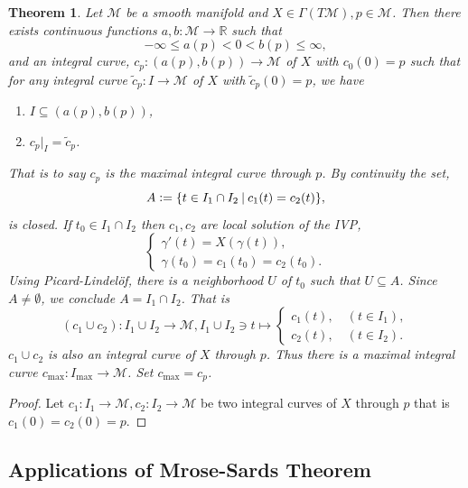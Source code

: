 \documentclass[10pt]{article}
\newtheorem{theorem}{Theorem} [section]
\newcommand{\defeq}{\vcentcolon=}
\newcommand{\R}[0]{\mathbb{R}}
\newcommand{\M}[0]{\mathcal{M}}
\newcommand{\sep}[0]{\:|\:}
\begin{document}
\begin{theorem}
  Let $\M$ be a smooth manifold and $X\in\Gamma(T\M), p\in\M$. Then there exists continuous functions $a,b:\M\to\R$ such that 
  \begin{equation*}
    -\infty \leq a(p)<0<b(p)\leq \infty,
  \end{equation*}
  and an integral curve, $c_p:(a(p),b(p))\to\M$ of $X$ with $c_0(0)=p$ such that for any integral curve $\tilde{c}_p:I\to\M$ of $X$ with $\tilde{c}_p(0)=p$, we have 
  \begin{enumerate}[1).]
    \item $I\subseteq(a(p),b(p))$,
    \item $c_p|_I = \tilde{c}_p$.
  \end{enumerate}
  That is to say $c_p$ is the maximal integral curve through $p$. By continuity the set,
  \begin{equation*}
    A\defeq  \{t\in I_1\cap I_2\sep c_1(t) = c_2(t)\},
  \end{equation*}
  is closed. If $t_0\in I_1\cap I_2$ then $c_1,c_2$ are local solution of the IVP,
  \begin{equation*}
    \begin{cases}
      \gamma'(t) = X(\gamma(t)),\\
      \gamma(t_0) = c_1(t_0) = c_2(t_0).
    \end{cases}
  \end{equation*}
  Using Picard-Lindelöf, there is a neighborhood $U$ of $t_0$ such that $U\subseteq A$. Since $A\not=\emptyset$, we conclude $A=I_1\cap I_2$. That is 
  \begin{equation*}
    (c_1\cup c_2):I_1\cup I_2\to\M, I_1\cup I_2\ni t\mapsto \begin{cases}
      c_1(t),\quad(t\in I_1),\\
      c_2(t), \quad (t\in I_2).
    \end{cases}
  \end{equation*}
  $c_1\cup c_2$ is also an integral curve of $X$ through $p$. Thus there is a maximal integral curve $c_{\max}:I_{\max}\to\M$. Set $c_{\max} = c_p$.
\end{theorem}

\begin{proof}
  Let $c_1:I_1\to\M,c_2:I_2\to\M$ be two integral curves of $X$ through $p$ that is $c_1(0)=c_2(0) = p$. 
\end{proof}

\subsection{Applications of Mrose-Sards Theorem}
\end{document}
